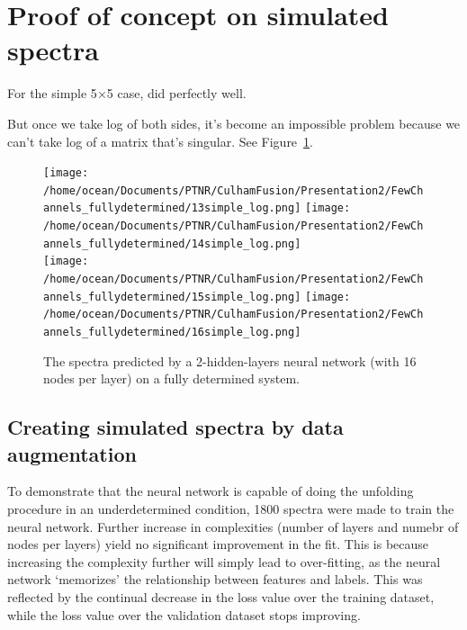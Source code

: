 \documentclass[a4paper, 12pt]{article}
\begin{document}
\section{Proof of concept on simulated spectra}
For the simple 5$\times$5 case, did perfectly well.

But once we take log of both sides, it's become an impossible problem because we can't take log of a matrix that's singular. See Figure~\ref{5x5}.

\begin{figure}
\centering
\texttt{[image: /home/ocean/Documents/PTNR/CulhamFusion/Presentation2/FewChannels\_fullydetermined/13simple\_log.png]}
\texttt{[image: /home/ocean/Documents/PTNR/CulhamFusion/Presentation2/FewChannels\_fullydetermined/14simple\_log.png]}\\
\texttt{[image: /home/ocean/Documents/PTNR/CulhamFusion/Presentation2/FewChannels\_fullydetermined/15simple\_log.png]}
\texttt{[image: /home/ocean/Documents/PTNR/CulhamFusion/Presentation2/FewChannels\_fullydetermined/16simple\_log.png]}
\caption{The spectra predicted by a 2-hidden-layers neural network (with 16 nodes per layer) on a fully determined system.} \label{5x5}
\end{figure}

\subsection{Creating simulated spectra by data augmentation}
To demonstrate that the neural network is capable of doing the unfolding procedure in an underdetermined condition, 1800 spectra were made to train the neural network.
Further increase in complexities (number of layers and numebr of nodes per layers) yield no significant improvement in the fit. This is because increasing the complexity further will simply lead to over-fitting, as the neural network `memorizes' the relationship between features and labels. This was reflected by the continual decrease in the loss value over the training dataset, while the loss value over the validation dataset stops improving.
\end{document}
